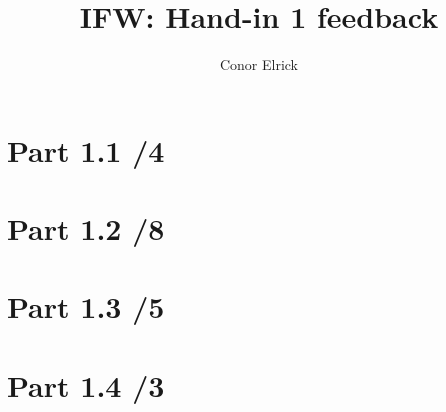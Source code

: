 \documentclass[12pt,a4paper]{article}
\author{Conor Elrick}
\title{IFW: Hand-in 1 feedback}
\begin{document}
\maketitle
\begin{tcolorbox}
\end{tcolorbox}
\section*{Part 1.1 \bf{/4}}
\section*{Part 1.2 \bf{/8}}
\section*{Part 1.3 \bf{/5}}
\section*{Part 1.4 \bf{/3}}
\end{document}
